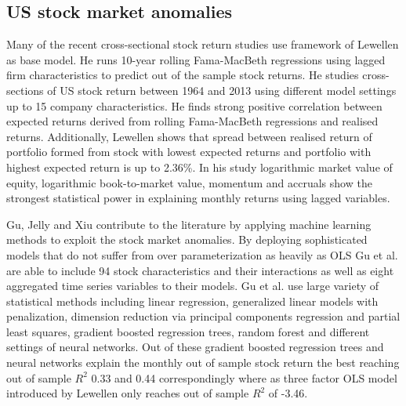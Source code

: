 \documentclass{article}
\begin{document}
\subsection{US stock market anomalies}\label{USStockMarketAnomalies}

Many of the recent cross-sectional stock return studies use framework of Lewellen \citeyear{Lewellen2015} as base model. He runs 10-year rolling Fama-MacBeth regressions using lagged firm characteristics to predict out of the sample stock returns. He studies cross-sections of US stock return between 1964 and 2013 using different model settings up to 15 company characteristics. He finds strong positive correlation between expected returns derived from rolling Fama-MacBeth regressions and realised returns. Additionally, Lewellen shows that spread between realised return of portfolio formed from stock with lowest expected returns and portfolio with highest expected return is up to 2.36\%. In his study logarithmic market value of equity, logarithmic book-to-market value, momentum and accruals show the strongest statistical power in explaining monthly returns using lagged variables. \par

Gu, Jelly and Xiu \citeyear{guetal} contribute to the literature by applying machine learning methods to exploit the stock market anomalies. By deploying sophisticated models that do not suffer from over parameterization as heavily as OLS Gu et al. are able to include 94 stock characteristics and their interactions as well as eight aggregated time series variables to their models. Gu et al. use large variety of statistical methods including linear regression, generalized linear models with penalization, dimension reduction via principal components regression and partial least squares, gradient boosted regression trees, random forest and different settings of neural networks. Out of these gradient boosted regression trees and neural networks \footnotemark explain the monthly out of sample stock return the best reaching out of sample $R^{2}$ 0.33 and 0.44 correspondingly where as three factor OLS model introduced by Lewellen \citeyear{Lewellen2015} only reaches out of sample $R^{2}$ of -3.46. \par

\end{document}
